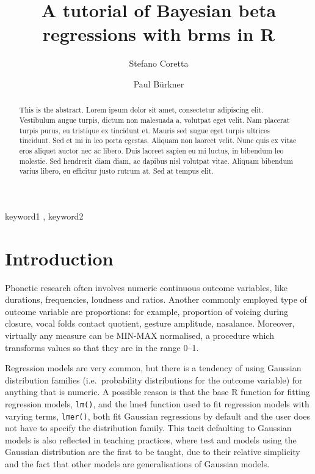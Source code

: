 \documentclass[
  authoryear,
  preprint,
  3p]{elsarticle}
\begin{document}
\begin{frontmatter}
\title{A tutorial of Bayesian beta regressions with brms in R}
\author[1]{Stefano Coretta%
%
}
\author[]{Paul Bürkner%
%
}



        
\begin{abstract}
This is the abstract. Lorem ipsum dolor sit amet, consectetur adipiscing
elit. Vestibulum augue turpis, dictum non malesuada a, volutpat eget
velit. Nam placerat turpis purus, eu tristique ex tincidunt et. Mauris
sed augue eget turpis ultrices tincidunt. Sed et mi in leo porta
egestas. Aliquam non laoreet velit. Nunc quis ex vitae eros aliquet
auctor nec ac libero. Duis laoreet sapien eu mi luctus, in bibendum leo
molestie. Sed hendrerit diam diam, ac dapibus nisl volutpat vitae.
Aliquam bibendum varius libero, eu efficitur justo rutrum at. Sed at
tempus elit.
\end{abstract}





\begin{keyword}
    keyword1 \sep 
    keyword2
\end{keyword}
\end{frontmatter}
    

\section{Introduction}\label{introduction}

Phonetic research often involves numeric continuous outcome variables,
like durations, frequencies, loudness and ratios. Another commonly
employed type of outcome variable are proportions: for example,
proportion of voicing during closure, vocal folds contact quotient,
gesture amplitude, nasalance. Moreover, virtually any measure can be
MIN-MAX normalised, a procedure which transforms values so that they are
in the range 0--1.

Regression models are very common, but there is a tendency of using
Gaussian distribution families (i.e.~probability distributions for the
outcome variable) for anything that is numeric. A possible reason is
that the base R function for fitting regression models, \texttt{lm()},
and the lme4 function used to fit regression models with varying terms,
\texttt{lmer()}, both fit Gaussian regressions by default and the user
does not have to specify the distribution family. This tacit defaulting
to Gaussian models is also reflected in teaching practices, where test
and models using the Gaussian distribution are the first to be taught,
due to their relative simplicity and the fact that other models are
generalisations of Gaussian models.
\end{document}
